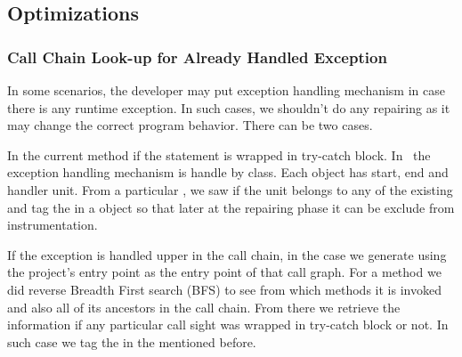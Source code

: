\subsection{Optimizations}
\label{subsec:optimizations}

\subsubsection{Call Chain Look-up for Already Handled Exception}
\label{subsubsec:callChainLookUp}

In some scenarios, the developer may put exception handling mechanism in case
there is any runtime exception. In such cases, we shouldn't do any repairing
as it may change the correct program behavior. There can be two cases.

\begin{mylist}

\item In the current method if the statement is wrapped in try-catch block. In
\soot\
the exception handling mechanism is handle by  class. Each
object has start, end and handler unit. From a particular , we saw if
the unit belongs to any of the existing \code{Trap} and tag the \code{Unit} in
a \code{HashMap} object so that later at the repairing phase it can be exclude
from instrumentation.

\item If the exception is handled upper in the call chain, in the case we
generate
 using the project's entry point as the entry point of that call
graph. For a method we did reverse Breadth First search (BFS) to see from which
methods it is invoked and also all of its ancestors in the call chain. From
there
we retrieve the information if any particular call sight was wrapped in
try-catch
block or not. In such case we tag the  in the 
mentioned
before.

\end{mylist}